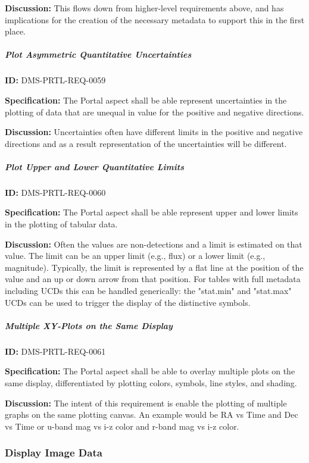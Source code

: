 \documentclass[SE,toc]{lsstdoc}
\begin{document}
\textbf{Discussion:}
This flows down from higher-level requirements above, and has implications for the creation of the necessary metadata to support this in the first place.

\subparagraph{Plot Asymmetric Quantitative Uncertainties}\hfill  %

\label{DMS-PRTL-REQ-0059}
\textbf{ID:} DMS-PRTL-REQ-0059

\textbf{Specification:}
The Portal aspect shall be able represent uncertainties in the plotting of data that are unequal in value for the positive and negative directions.

\textbf{Discussion:}
Uncertainties often have different limits in the positive and negative directions and as a result representation of the uncertainties will be different.

\subparagraph{Plot Upper and Lower Quantitative Limits}\hfill  %

\label{DMS-PRTL-REQ-0060}
\textbf{ID:} DMS-PRTL-REQ-0060

\textbf{Specification:}
The Portal aspect shall be able represent upper and lower limits in the plotting of tabular data.

\textbf{Discussion:}
Often the values are non-detections and a limit is estimated on that value.  The limit can be an upper limit (e.g., flux) or a lower limit (e.g., magnitude).  Typically, the limit is represented by a flat line at the position of the value and an up or down arrow from that position.
For tables with full metadata including UCDs this can be handled generically: the "stat.min" and "stat.max" UCDs can be used to trigger the display of the distinctive symbols.

\subparagraph{Multiple XY-Plots on the Same Display}\hfill  %

\label{DMS-PRTL-REQ-0061}
\textbf{ID:} DMS-PRTL-REQ-0061

\textbf{Specification:}
The Portal aspect shall be able to overlay multiple plots on the same display, differentiated by plotting colors, symbols, line styles, and shading.

\textbf{Discussion:}
The intent of this requirement is enable the plotting of multiple graphs on the same plotting canvas.  An example would be RA vs Time and Dec vs Time or u-band mag vs i-z color and r-band mag vs i-z color.

\subsubsection{Display Image Data}
\end{document}
